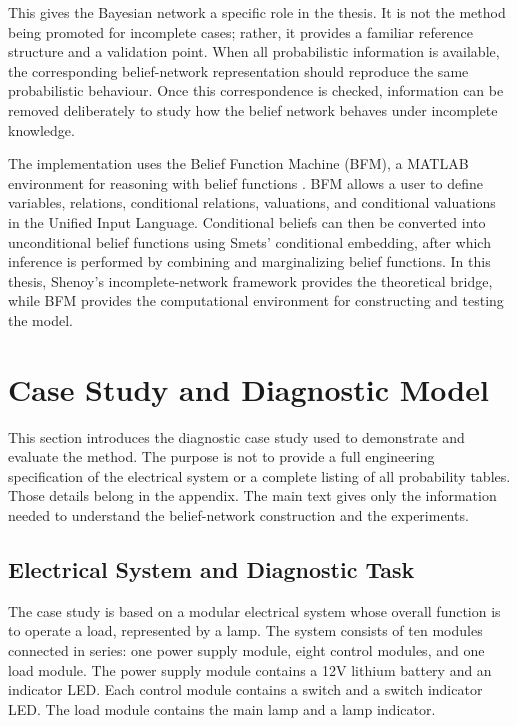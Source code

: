 \documentclass[runningheads]{llncs}
\begin{document}
This gives the Bayesian network a specific role in the thesis. It is not the method being promoted for incomplete cases; rather, it provides a familiar reference structure and a validation point. When all probabilistic information is available, the corresponding belief-network representation should reproduce the same probabilistic behaviour. Once this correspondence is checked, information can be removed deliberately to study how the belief network behaves under incomplete knowledge.

The implementation uses the Belief Function Machine (BFM), a MATLAB environment for reasoning with belief functions \cite{GiangShenoy2003BFM}. BFM allows a user to define variables, relations, conditional relations, valuations, and conditional valuations in the Unified Input Language. Conditional beliefs can then be converted into unconditional belief functions using Smets' conditional embedding, after which inference is performed by combining and marginalizing belief functions. In this thesis, Shenoy's incomplete-network framework provides the theoretical bridge, while BFM provides the computational environment for constructing and testing the model.

\section{Case Study and Diagnostic Model}
\label{sec:case_study_diagnostic_model}

This section introduces the diagnostic case study used to demonstrate and evaluate the method. The purpose is not to provide a full engineering specification of the electrical system or a complete listing of all probability tables. Those details belong in the appendix. The main text gives only the information needed to understand the belief-network construction and the experiments.

\subsection{Electrical System and Diagnostic Task}
\label{sec:electrical_system_diagnostic_task}

The case study is based on a modular electrical system whose overall function is to operate a load, represented by a lamp. The system consists of ten modules connected in series: one power supply module, eight control modules, and one load module. The power supply module contains a 12V lithium battery and an indicator LED. Each control module contains a switch and a switch indicator LED. The load module contains the main lamp and a lamp indicator.
\end{document}
